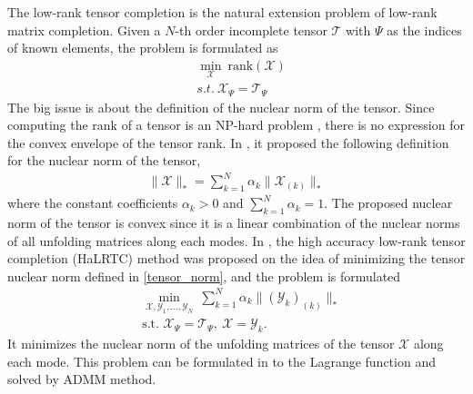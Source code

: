 \documentclass[12pt, draftcls, onecolumn]{IEEEtran}
\theoremstyle{plain}
\theoremstyle{definition}
\theoremstyle{remark}
\newcommand{\nt}[1]{\textcolor{red}{\textbf{[#1]}}}
\begin{document}
The low-rank tensor completion is the natural extension problem of low-rank matrix completion.
Given a $N$-th order incomplete tensor $\mathcal{T}$ with $\Psi$ as the indices of known elements, the problem is formulated as
\begin{equation}
\begin{aligned}
    &\min_{\mathcal{X}}\ \text{rank}(\mathcal{X})\\
    &{s.t.}\ 
        \mathcal{X}_\Psi = \mathcal{T}_\Psi
\end{aligned}    
\end{equation}
The big issue is about the definition of the nuclear norm of the tensor.
Since computing the rank of a tensor is an NP-hard problem \cite{Hillar:2013:MTP:2555516.2512329}, there is no expression for the convex envelope of the tensor rank.
In \cite{Liu2013}, it proposed the following definition for the nuclear norm of the tensor,
\begin{equation}
\begin{aligned}
	\label{tensor_norm}
	\lVert\mathcal{X}\rVert_*=\sum_{k=1}^{N} \alpha_k\lVert\mathcal{X}_{(k)}\rVert_*
\end{aligned}
\end{equation}
where the constant coefficients $\alpha_k>0$ and $\sum_{k=1}^N \alpha_k =1$.
The proposed nuclear norm of the tensor is convex since it is a linear combination of the nuclear norms of all unfolding matrices along each modes.
In \cite{Liu2013}, the high accuracy low-rank tensor completion (HaLRTC) method was proposed on the idea of minimizing the tensor nuclear norm defined in \eqref{tensor_norm}, and the problem is formulated
\begin{equation}
\begin{aligned}
	\label{HaLRTC}
	&\min_{\mathcal{X},\mathcal{Y}_1,\dots,\mathcal{Y}_N}\ \sum_{k=1}^{N}\alpha_k \lVert(\mathcal{Y}_k)_{(k)}\rVert_*\\
	&\text{s.t. }
	 \mathcal{X}_\Psi = \mathcal{T}_\Psi,\ \mathcal{X}=\mathcal{Y}_k.
\end{aligned}
\end{equation}
It minimizes the nuclear norm of the unfolding matrices of the tensor $\mathcal{X}$ along each mode.
This problem can be formulated in to the Lagrange function and solved by ADMM method.
\end{document}
